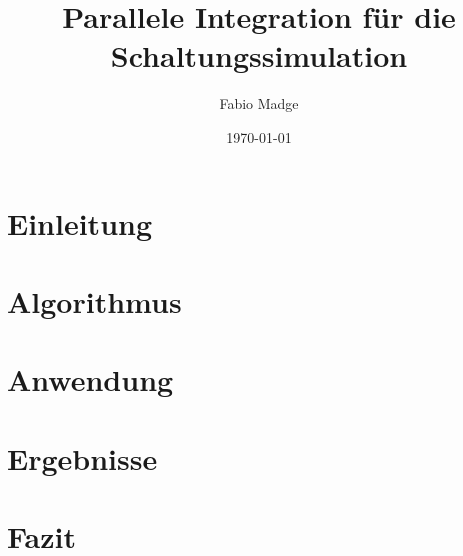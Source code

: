\documentclass[12pt,a4paper]{article}
\title{Parallele Integration für die Schaltungssimulation}
\author{Fabio Madge}
\date{\today}
\begin{document}
\maketitle

\section{Einleitung}


\section{Algorithmus}


\section{Anwendung}


\section{Ergebnisse}


\section{Fazit}




\end{document}
